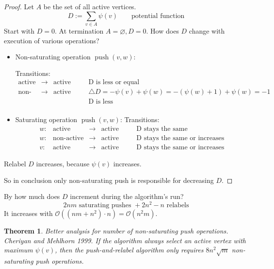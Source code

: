 \documentclass{article}
\newtheorem{theorem}{Theorem}
\DeclareMathOperator{\push}{push}
\begin{document}
\begin{proof}
  Let $A$ be the set of all active vertices.
  \[
    D := \sum_{v \in A} \psi(v) \qquad \text{potential function}
  \]
  Start with $D = 0$. At termination $A = \diameter, D = 0$.
  How does $D$ change with execution of various operations?

  \begin{itemize}
    \item Non-saturating operation $\push(v, w)$:

      Transitions:
      \[
        \begin{array}{rclcc}
          \text{active}     & \rightarrow & \text{active} & \quad & \text{D is less or equal} \\
          \text{non-active} & \rightarrow & \text{active} & \quad & \triangle D = -\psi(v) + \psi(w) = -(\psi(w) + 1) + \psi(w) = -1 \\
                            &             &               &       & \text{D is less} \\
        \end{array}
      \]

    \item Saturating operation $\push(v, w)$:
      Transitions:
      \[
        \begin{array}{rrclcc}
          w: & \text{active}     & \rightarrow & \text{active} & \quad & \text{D stays the same} \\
          w: & \text{non-active} & \rightarrow & \text{active} & \quad & \text{D stays the same or increases} \\
          v: & \text{active}     & \rightarrow & \text{active} & \quad & \text{D stays the same or increases}
        \end{array}
      \]
  \end{itemize}

  Relabel $D$ increases, because $\psi(v)$ increases.

  So in conclusion only non-saturating push is responsible for decreasing $D$.

\end{proof}

By how much does $D$ increment during the algorithm's run?
\[
  2nm \text{ saturating pushes } + 2n^2 - n \text{ relabels}
\]
It increases with $\mathcal{O}((nm + n^2) \cdot n) = \mathcal{O}(n^2m)$.

\begin{theorem}\label{lemma-4.14}
  \emph{Better analysis for number of non-saturating push operations. Cheriyan and Mehlhorn 1999.}
  If the algorithm always select an active vertex with maximum $\psi(v)$, then the push-and-relabel algorithm only requires $8n^2 \sqrt{m}$ non-saturating push operations.
\end{theorem}
\end{document}
